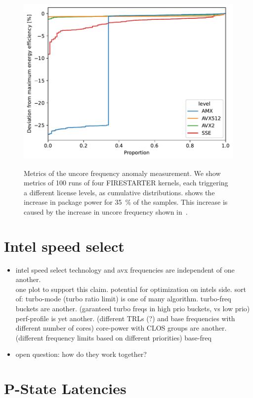 \begin{figure}[t!]
{        \includegraphics[width=.48\linewidth]{fig/avx-frequency-uncore-anomaly-energy-efficiency-ecdf.pdf}%
        \label{fig:avx-frequency-uncore-anomaly-max-ee}%
    }
    \caption{Metrics of the uncore frequency anomaly measurement.
    We show metrics of \SI{100}{} runs of four FIRESTARTER kernels, each triggering a different license levels, as cumulative distributions.
     shows the increase in package power for \SI{35}{\percent} of the samples.
    This increase is caused by the increase in uncore frequency shown in~.}
    \label{fig:avx-frequency-uncore-anomaly}
\end{figure}


\section{Intel speed select}
\label{sec:isst}

\begin{itemize}
    \item intel speed select technology and avx frequencies are independent of one another.\\
    one plot to support this claim. potential for optimization on intels side.
    sort of: turbo-mode (turbo ratio limit) is one of many algorithm.
    turbo-freq buckets are another. (garanteed turbo freqs in high prio buckets, vs low prio)
    perf-profile is yet another. (different TRLs (?) and base frequencies with different number of cores)
    core-power with CLOS groups are another. (different frequency limits based on different priorities)
    base-freq
    \item open question: how do they work together?
\end{itemize}



\section{P-State Latencies}

